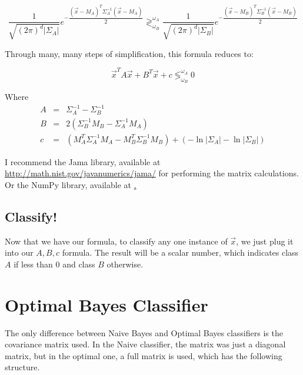 \documentclass{article}
\begin{document}
\begin{displaymath}
  \dfrac{1}{\sqrt{(2\pi)^d |\Sigma_A|}} e^{-\dfrac{(\vec{x}-M_A)^T \Sigma^{-1}_A (\vec{x}-M_A)}{2}}
  \gtrless^{\omega_A}_{\omega_B} 
  \dfrac{1}{\sqrt{(2\pi)^d |\Sigma_B|}} e^{-\dfrac{(\vec{x}-M_B)^T \Sigma^{-1}_B (\vec{x}-M_B)}{2}}
\end{displaymath}


Through many, many steps of simplification, this formula reduces to:

\begin{displaymath}
\vec{x}^{T}A\vec{x} + B^{T}\vec{x} + c  \lessgtr^{\omega_A}_{\omega_B} 0
\end{displaymath}

Where
\begin{eqnarray*}
  A & = & \Sigma^{-1}_A - \Sigma^{-1}_B \\
  B & = & 2(\Sigma^{-1}_B M_{B} - \Sigma^{-1}_A M_{A})\\
  c & = & (M^{T}_{A}\Sigma^{-1}_{A}M_A - M^{T}_{B}\Sigma^{-1}_{B}M_B) + (-\ln{|\Sigma_A|} - \ln{|\Sigma_B|})
\end{eqnarray*}

I recommend the Jama library, available at
\href{http://math.nist.gov/javanumerics/jama/}{http://math.nist.gov/javanumerics/jama/}
for performing the matrix calculations.  Or the NumPy library,
available at \href{http://numpy.scipy.org/}.

\subsection{Classify!}

Now that we have our formula, to classify any one instance of
$\vec{x}$, we just plug it into our $A, B, c$ formula.  The result
will be a scalar number, which indicates class $A$ if less than $0$
and class $B$ otherwise.



\section{Optimal Bayes Classifier}
\label{sec:obayes}

The only difference between Naive Bayes and Optimal Bayes classifiers
is the covariance matrix used.  In the Naive classifier, the matrix
was just a diagonal matrix, but in the optimal one, a full matrix is
used, which has the following structure.
\end{document}
